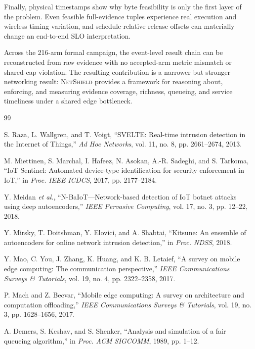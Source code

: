 \documentclass[10pt,journal]{IEEEtran}
\newcommand{\NetShield}{\textsc{NetShield}}
\begin{document}
Finally, physical timestamps show why byte feasibility is only the first
layer of the problem. Even feasible full-evidence tuples experience
real execution and wireless timing variation, and schedule-relative
release offsets can materially change an end-to-end SLO interpretation.

Across the 216-arm formal campaign, the event-level result chain can be
reconstructed from raw evidence with no accepted-arm metric mismatch or
shared-cap violation. The resulting contribution is a narrower but
stronger networking result: \NetShield{} provides a framework for
reasoning about, enforcing, and measuring evidence coverage, richness,
queueing, and service timeliness under a shared edge bottleneck.

\begin{thebibliography}{99}

S. Raza, L. Wallgren, and T. Voigt,
``SVELTE: Real-time intrusion detection in the Internet of Things,''
\emph{Ad Hoc Networks}, vol. 11, no. 8, pp. 2661--2674, 2013.

M. Miettinen, S. Marchal, I. Hafeez, N. Asokan, A.-R. Sadeghi,
and S. Tarkoma,
``IoT Sentinel: Automated device-type identification for security
enforcement in IoT,''
in \emph{Proc. IEEE ICDCS}, 2017, pp. 2177--2184.

Y. Meidan \emph{et al.},
``N-BaIoT---Network-based detection of IoT botnet attacks using deep
autoencoders,''
\emph{IEEE Pervasive Computing}, vol. 17, no. 3, pp. 12--22, 2018.

Y. Mirsky, T. Doitshman, Y. Elovici, and A. Shabtai,
``Kitsune: An ensemble of autoencoders for online network intrusion
detection,''
in \emph{Proc. NDSS}, 2018.

Y. Mao, C. You, J. Zhang, K. Huang, and K. B. Letaief,
``A survey on mobile edge computing: The communication perspective,''
\emph{IEEE Communications Surveys \& Tutorials},
vol. 19, no. 4, pp. 2322--2358, 2017.

P. Mach and Z. Becvar,
``Mobile edge computing: A survey on architecture and computation
offloading,''
\emph{IEEE Communications Surveys \& Tutorials},
vol. 19, no. 3, pp. 1628--1656, 2017.

A. Demers, S. Keshav, and S. Shenker,
``Analysis and simulation of a fair queueing algorithm,''
in \emph{Proc. ACM SIGCOMM}, 1989, pp. 1--12.


\end{thebibliography}
\end{document}
